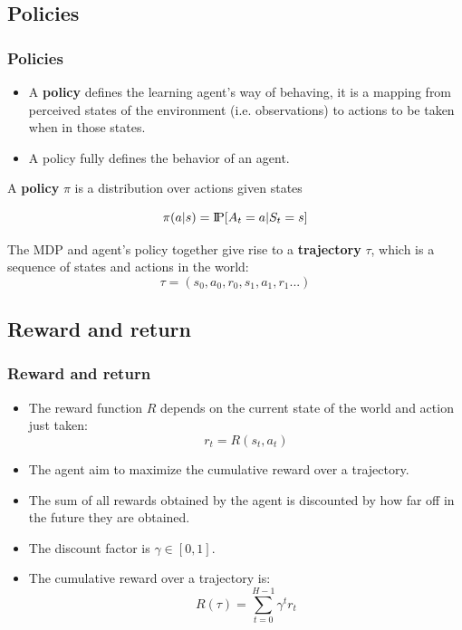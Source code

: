 \documentclass[10pt]{beamer}
\newcommand{\Pprob}{\text{I\kern-0.15em P}}
\begin{document}

\subsection{Policies}
\begin{frame}
	\frametitle{Policies}
\begin{itemize}
	\item A \textbf{policy} defines the learning agent's way of behaving, it is a mapping from perceived states of the environment (i.e. observations) to actions to be taken when in those states.
	\item A policy fully defines the behavior of an agent.
\end{itemize}

\begin{definition}
	 A \textbf{policy} $\pi$ is a distribution over actions given states
	
	\begin{equation}
	\pi(a | s) = \Pprob[A_t=a|S_t=s]
	\end{equation}

\end{definition}

The MDP and agent's policy together give rise to a \textbf{trajectory} $\tau$, which is a sequence of states and actions in the world:
$$\tau = (s_0, a_0, r_0, s_1, a_1, r_1...)$$

\end{frame}



\subsection{Reward and return}
\begin{frame}

	\frametitle{Reward and return}
	\begin{itemize}
		\item The reward function $R$ depends on the current state of the world and action just taken:
		$$r_t = R(s_t, a_t)$$
		\item The agent aim to maximize the cumulative reward over a trajectory.
		\item The sum of all rewards obtained by the agent is discounted by how far off in the future they are obtained. \item The discount factor is $\gamma \in [0,1]$.
		\item The cumulative reward over a trajectory is:		
			\begin{equation}
			R(\tau) = \sum_{t=0}^{H-1} \gamma^t r_t
			\end{equation}
	\end{itemize}
	
\end{frame}
\end{document}
